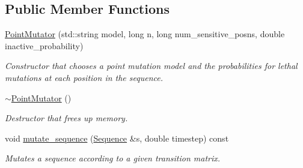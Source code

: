 \subsection*{Public Member Functions}
\begin{DoxyCompactItemize}
\item 
\mbox{\label{classrcombinator_1_1PointMutator_ab8051bc801ddedf28cca4e863cfa99d6}} 
\mbox{\hyperlink{classrcombinator_1_1PointMutator_ab8051bc801ddedf28cca4e863cfa99d6}{Point\+Mutator}} (std\+::string model, long n, long num\+\_\+sensitive\+\_\+posns, double inactive\+\_\+probability)
\begin{DoxyCompactList}\small\item\em Constructor that chooses a point mutation model and the probabilities for lethal mutations at each position in the sequence. \end{DoxyCompactList}\item 
\mbox{\label{classrcombinator_1_1PointMutator_ab4bb79937f1824e7fba92fb824f27c56}} 
\mbox{\hyperlink{classrcombinator_1_1PointMutator_ab4bb79937f1824e7fba92fb824f27c56}{$\sim$\+Point\+Mutator}} ()
\begin{DoxyCompactList}\small\item\em Destructor that frees up memory. \end{DoxyCompactList}\item 
\mbox{\label{classrcombinator_1_1PointMutator_aba3c2b8641affe8a06d815c33cafdc1b}} 
void \mbox{\hyperlink{classrcombinator_1_1PointMutator_aba3c2b8641affe8a06d815c33cafdc1b}{mutate\+\_\+sequence}} (\mbox{\hyperlink{classrcombinator_1_1Sequence}{Sequence}} \&s, double timestep) const
\begin{DoxyCompactList}\small\item\em Mutates a sequence according to a given transition matrix. \end{DoxyCompactList}\end{DoxyCompactItemize}
